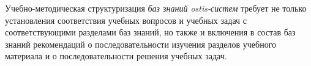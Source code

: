 \begin{SCn}
\begin{SCn}
\end{SCn}

\begin{SCn}
\end{SCn}

\begin{SCn}
\end{SCn}

\begin{SCn}
\end{SCn}

Учебно-методическая структуризация \textit{баз знаний ostis-систем} требует не только установления соответствия учебных вопросов и учебных задач с соответствующими разделами баз знаний, но также и включения в состав баз знаний рекомендаций о последовательности изучения разделов учебного материала и о последовательности решения учебных задач.


\end{SCn}
